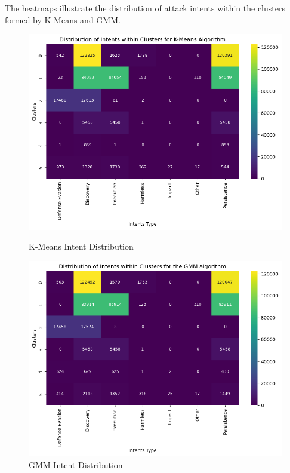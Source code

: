         The heatmaps illustrate the distribution of attack intents within the clusters formed by K-Means and GMM.
        
        \begin{figure}[h]
            \centering
            \begin{minipage}[c]{0.47\textwidth}
                \centering
                \includegraphics[width=\textwidth]{../figures/plots/section3/Intent_Distribution_kmeans.png}
                \vspace{-0.6cm}
                \caption{K-Means Intent Distribution}
                \label{fig:}
            \end{minipage}
            \hfill
            \begin{minipage}[c]{0.47\textwidth}
                \centering
                \includegraphics[width=\textwidth]{../figures/plots/section3/Intent_Distribution_gmm.png}
                \vspace{-0.6cm}
                \caption{GMM Intent Distribution}
                \label{fig:}
            \end{minipage}
        \end{figure}
    